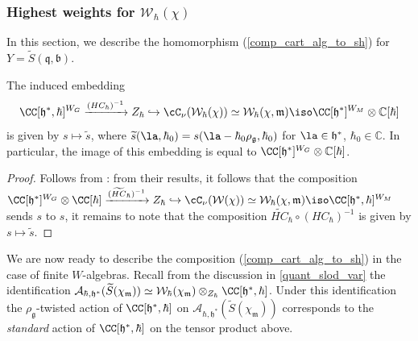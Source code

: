 \documentclass[12pt]{amsart}
\begin{document}
\subsubsection{Highest weights for $\mathcal{W}_\hbar(\chi)$}
In this section, we describe the homomorphism (\ref{comp_cart_alg_to_sh}) for $Y=\widetilde{S}(\mathfrak{q},\mathfrak{b})$. 



\begin{prop}\label{BGK_hw_theory}
The induced embedding 
\begin{equation*}
\CC[\mathfrak{h}^*,\hbar]^{W_G} \xrightarrow{(HC_\hbar)^{-1}} Z_\hbar \hookrightarrow \cC_\nu(\mathcal{W}_\hbar(\chi)) \simeq \mathcal{W}_\hbar(\chi,\mathfrak{m}) \iso \CC[\mathfrak{h}^*]^{W_M} \otimes \mathbb{C}[\hbar]
\end{equation*}
is given by $s \mapsto \widetilde{s}$, where $\widetilde{s}(\la,\hbar_0)=s(\la-\hbar_0\rho_{\mathfrak{g}},\hbar_0)$ for $\la \in \mathfrak{h}^*$, $\hbar_0 \in \mathbb{C}$. In particular, the image of this embedding is equal to $\CC[\mathfrak{h}^*]^{W_G} \otimes \mathbb{C}[\hbar]$.
\end{prop}
\begin{proof}
Follows from \cite[Theorem 4.7 and Lemma 5.1]{BGK}: from their results, it follows that the composition $\CC[\mathfrak{h}^*]^{W_G} \otimes \CC[\hbar] \xrightarrow{(\widetilde{HC}_\hbar)^{-1}} Z_\hbar \hookrightarrow \cC_\nu(\mathcal{W}(\chi)) \simeq \mathcal{W}_\hbar(\chi,\mathfrak{m}) \iso \CC[\mathfrak{h}^*,\hbar]^{W_M}$ sends $s$ to $s$, 
it remains to note that the composition $\widetilde{HC}_{\hbar} \circ (HC_\hbar)^{-1}$ is given by $s \mapsto \widetilde{s}$. 
\end{proof}




We are now ready to describe the composition (\ref{comp_cart_alg_to_sh}) in the case of finite $W$-algebras.
Recall from the discussion in  \cref{quant_slod_var} the identification $\mathcal{A}_{\hbar,\mathfrak{h}^*}(\widetilde{S}(\chi_{\mathfrak{m}})) \simeq \mathcal{W}_\hbar(\chi_{\mathfrak{m}}) \otimes_{Z_\hbar} \CC[\mathfrak{h}^*,\hbar]$. 
Under this identification the $\rho_{\mathfrak{g}}$-twisted action of $\CC[\mathfrak{h}^*,\hbar]$ on $\mathcal{A}_{\hbar,\mathfrak{h}^*}(\widetilde{S}(\chi_{\mathfrak{m}}))$ corresponds to the {\emph{standard}} action of $\CC[\mathfrak{h}^*,\hbar]$ on the tensor product above.
\end{document}
